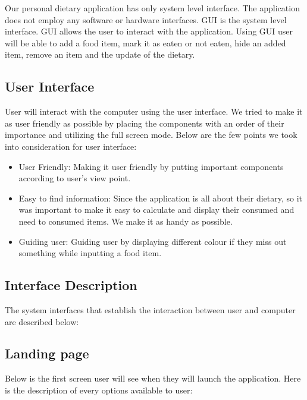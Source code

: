 \documentclass{scrreprt}
\begin{document}
Our personal dietary application has only system level interface. The application does not employ any software or hardware interfaces. GUI is the system level interface. GUI allows the user to interact with the application. Using GUI user will be able to add a food item, mark it as eaten or not eaten, hide an added item, remove an item and the update of the dietary.

\subsection{User Interface}

User will interact with the computer using the user interface. We tried to make it as user friendly as possible by placing the components with an order of their importance and utilizing the full screen mode. Below are the few points we took into consideration for user interface:

\begin{itemize}
\item User Friendly: Making it user friendly by putting important components according to user's view point.
\item Easy to find information: Since the application is all about their dietary, so it was important to make it easy to calculate and display their consumed and need to consumed items. We make it as handy as possible.
\item Guiding user: Guiding user by displaying different colour if they miss out something while inputting a food item.
\end{itemize}

\subsection{Interface Description}
The system interfaces that establish the interaction between user and computer are described below:

\clearpage

\subsection{Landing page}
Below is the first screen user will see when they will launch the application. Here is the description of every options available to user:
\end{document}

